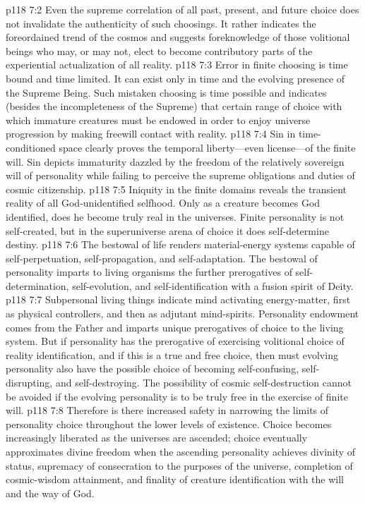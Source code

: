 \vs p118 7:2 Even the supreme correlation of all past, present, and future choice does not invalidate the authenticity of such choosings. It rather indicates the foreordained trend of the cosmos and suggests foreknowledge of those volitional beings who may, or may not, elect to become contributory parts of the experiential actualization of all reality.
\pc \vs p118 7:3 Error in finite choosing is time bound and time limited. It can exist only in time and  the evolving presence of the Supreme Being. Such mistaken choosing is time possible and indicates (besides the incompleteness of the Supreme) that certain range of choice with which immature creatures must be endowed in order to enjoy universe progression by making freewill contact with reality.
\vs p118 7:4 Sin in time\hyp{}conditioned space clearly proves the temporal liberty---even license---of the finite will. Sin depicts immaturity dazzled by the freedom of the relatively sovereign will of personality while failing to perceive the supreme obligations and duties of cosmic citizenship.
\vs p118 7:5 Iniquity in the finite domains reveals the transient reality of all God\hyp{}unidentified selfhood. Only as a creature becomes God identified, does he become truly real in the universes. Finite personality is not self\hyp{}created, but in the superuniverse arena of choice it does self\hyp{}determine destiny.
\pc \vs p118 7:6 The bestowal of life renders material\hyp{}energy systems capable of self\hyp{}perpetuation, self\hyp{}propagation, and self\hyp{}adaptation. The bestowal of personality imparts to living organisms the further prerogatives of self\hyp{}determination, self\hyp{}evolution, and self\hyp{}identification with a fusion spirit of Deity.
\vs p118 7:7 Subpersonal living things indicate mind activating energy\hyp{}matter, first as physical controllers, and then as adjutant mind\hyp{}spirits. Personality endowment comes from the Father and imparts unique prerogatives of choice to the living system. But if personality has the prerogative of exercising volitional choice of reality identification, and if this is a true and free choice, then must evolving personality also have the possible choice of becoming self\hyp{}confusing, self\hyp{}disrupting, and self\hyp{}destroying. The possibility of cosmic self\hyp{}destruction cannot be avoided if the evolving personality is to be truly free in the exercise of finite will.\plusone
\vs p118 7:8 Therefore is there increased safety in narrowing the limits of personality choice throughout the lower levels of existence. Choice becomes increasingly liberated as the universes are ascended; choice eventually approximates divine freedom when the ascending personality achieves divinity of status, supremacy of consecration to the purposes of the universe, completion of cosmic\hyp{}wisdom attainment, and finality of creature identification with the will and the way of God.
